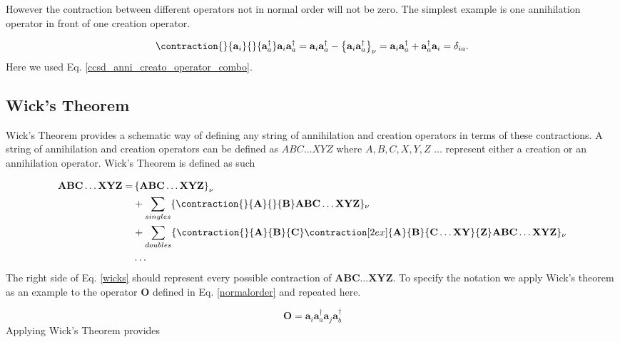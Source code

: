 However the contraction between different operators not in normal order will not be zero. The simplest example is one annihilation operator in front of one creation operator.

\begin{equation}
\contraction{}{\textbf{a}_i}{}{\textbf{a}^{\dag}_a}
\textbf{a}_i\textbf{a}^{\dag}_a
= \textbf{a}_i \textbf{a}^{\dag}_a - \left\{ \textbf{a}_i \textbf{a}^{\dag}_a \right\}_{\nu} = \textbf{a}_i \textbf{a}^{\dag}_a + \textbf{a}^{\dag}_a \textbf{a}_i = \delta_{ia} .
\end{equation}
Here we used Eq. \eqref{ccsd_anni_creato_operator_combo}.

\subsection{Wick's Theorem}
Wick's Theorem provides a schematic way of defining any string of annihilation and creation operators in terms of these contractions. A string of annihilation and creation operators can be defined as $ABC \dots XYZ$ where $A, B, C, X, Y, Z$ $\dots$ represent either a creation or an annihilation operator.  Wick's Theorem is defined as such

\begin{align}
\textbf{A} \textbf{B} \textbf{C} \dots \textbf{X} \textbf{Y} \textbf{Z} = & \left\{\textbf{A} \textbf{B} \textbf{C} \dots \textbf{X} \textbf{Y} \textbf{Z} \right\}_{\nu} \label{wicks} \\
& + \sum_{singles} \{
\contraction{}{\textbf{A}}{}{\textbf{B}}
\textbf{A}\textbf{B}
\textbf{C} \dots \textbf{X} \textbf{Y} \textbf{Z}
\}_{\nu} \nonumber \\
& + \sum_{doubles} \{
\contraction{}{\textbf{A}}{\textbf{B}}{\textbf{C}}
\contraction[2ex]{\textbf{A}}{\textbf{B}}{\textbf{C} \dots \textbf{X} \textbf{Y}}{\textbf{Z}}
\textbf{A} \textbf{B} \textbf{C} \dots \textbf{X} \textbf{Y} \textbf{Z} 
\}_{\nu} \nonumber \\
& \dots \nonumber
\end{align}
The right side of Eq. \eqref{wicks} should represent every possible contraction of $\textbf{A} \textbf{B} \textbf{C} \dots \textbf{X} \textbf{Y} \textbf{Z}$. To specify the notation we apply Wick's theorem as an example to the operator $\textbf{O}$ defined in Eq. \eqref{normalorder} and repeated here.

\begin{equation}
\textbf{O} = \textbf{a}_i \textbf{a}^{\dag}_a \textbf{a}_j \textbf{a}^{\dag}_b \nonumber
\end{equation}
Applying Wick's Theorem provides

